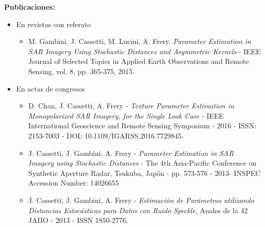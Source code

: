 \textbf{Publicaciones:}
\begin{itemize}
	\item En revistas con referato
	\begin{itemize}
		\item M. Gambini, J. Cassetti, M. Lucini, A. Frery. \emph{Parameter Estimation in SAR Imagery Using Stochastic Distances and Asymmetric Kernels} - IEEE Journal of Selected Topics in Applied Earth Observations and Remote Sensing, vol. 8, pp. 365-375, 2015.
	\end{itemize}
	\item En actas de congresos
	\begin{itemize}
		\item  D. Chan, J. Cassetti, A. Frery - \emph{Texture Parameter Estimation in Monopolarized SAR Imagery, for the Single Look Case} - IEEE International Geoscience and Remote Sensing Symposium - 2016 - ISSN: 2153-7003 -  DOI: 10.1109/IGARSS.2016.7729845.
		
		\item J. Cassetti, J. Gambini, A. Frery - \emph{Parameter Estimation in SAR Imagery using Stochastic Distances} - The 4th Asia-Pacific Conference on Synthetic Aperture Radar, Tsukuba, Japón - pp. 573-576 - 2013- INSPEC Accession Number: 14026655 
		
		\item J. Cassetti, J. Gambini, A. Frery - \emph{Estimación de Parámetros utilizando Distancias Estocásticas para Datos con Ruido Speckle}, Anales de la 42 JAIIO - 2013 - ISSN 1850-2776.
	\end{itemize}
\end{itemize}

